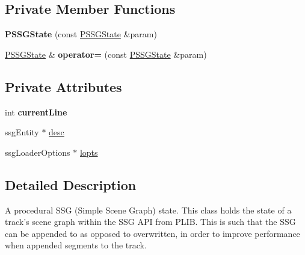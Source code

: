 \subsection*{Private Member Functions}
\begin{DoxyCompactItemize}
\item 
\hypertarget{classprocedural_1_1_p_s_s_g_state_a71e0ca176b3e5b16e257559cd8f58f7e}{{\bfseries P\-S\-S\-G\-State} (const \hyperlink{classprocedural_1_1_p_s_s_g_state}{P\-S\-S\-G\-State} \&param)}\label{classprocedural_1_1_p_s_s_g_state_a71e0ca176b3e5b16e257559cd8f58f7e}

\item 
\hypertarget{classprocedural_1_1_p_s_s_g_state_a9becab8564ce90500328f1a367f272e8}{\hyperlink{classprocedural_1_1_p_s_s_g_state}{P\-S\-S\-G\-State} \& {\bfseries operator=} (const \hyperlink{classprocedural_1_1_p_s_s_g_state}{P\-S\-S\-G\-State} \&param)}\label{classprocedural_1_1_p_s_s_g_state_a9becab8564ce90500328f1a367f272e8}

\end{DoxyCompactItemize}
\subsection*{Private Attributes}
\begin{DoxyCompactItemize}
\item 
\hypertarget{classprocedural_1_1_p_s_s_g_state_a306ecd228be44f28d2cb22752c353dcf}{int {\bfseries current\-Line}}\label{classprocedural_1_1_p_s_s_g_state_a306ecd228be44f28d2cb22752c353dcf}

\item 
ssg\-Entity $\ast$ \hyperlink{classprocedural_1_1_p_s_s_g_state_a1fafaa73d84de0fda20c7f36d7f32301}{desc}
\item 
ssg\-Loader\-Options $\ast$ \hyperlink{classprocedural_1_1_p_s_s_g_state_a7ceeefffacba2633fd7fb490b2ff3332}{lopts}
\end{DoxyCompactItemize}


\subsection{Detailed Description}
A procedural S\-S\-G (Simple Scene Graph) state. This class holds the state of a track's scene graph within the S\-S\-G A\-P\-I from P\-L\-I\-B. This is such that the S\-S\-G can be appended to as opposed to overwritten, in order to improve performance when appended segments to the track. 

